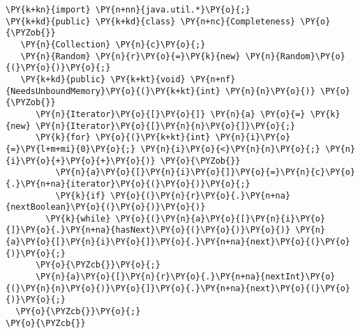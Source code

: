 \begin{Verbatim}[commandchars=\\\{\}]
\PY{k+kn}{import} \PY{n+nn}{java.util.*}\PY{o}{;}
\PY{k+kd}{public} \PY{k+kd}{class} \PY{n+nc}{Completeness} \PY{o}{\PYZob{}}
   \PY{n}{Collection} \PY{n}{c}\PY{o}{;}
   \PY{n}{Random} \PY{n}{r}\PY{o}{=}\PY{k}{new} \PY{n}{Random}\PY{o}{(}\PY{o}{)}\PY{o}{;}
   \PY{k+kd}{public} \PY{k+kt}{void} \PY{n+nf}{NeedsUnboundMemory}\PY{o}{(}\PY{k+kt}{int} \PY{n}{n}\PY{o}{)} \PY{o}{\PYZob{}}
      \PY{n}{Iterator}\PY{o}{[}\PY{o}{]} \PY{n}{a} \PY{o}{=} \PY{k}{new} \PY{n}{Iterator}\PY{o}{[}\PY{n}{n}\PY{o}{]}\PY{o}{;}
      \PY{k}{for} \PY{o}{(}\PY{k+kt}{int} \PY{n}{i}\PY{o}{=}\PY{l+m+mi}{0}\PY{o}{;} \PY{n}{i}\PY{o}{<}\PY{n}{n}\PY{o}{;} \PY{n}{i}\PY{o}{+}\PY{o}{+}\PY{o}{)} \PY{o}{\PYZob{}}
          \PY{n}{a}\PY{o}{[}\PY{n}{i}\PY{o}{]}\PY{o}{=}\PY{n}{c}\PY{o}{.}\PY{n+na}{iterator}\PY{o}{(}\PY{o}{)}\PY{o}{;}
          \PY{k}{if} \PY{o}{(}\PY{n}{r}\PY{o}{.}\PY{n+na}{nextBoolean}\PY{o}{(}\PY{o}{)}\PY{o}{)} 
	    \PY{k}{while} \PY{o}{(}\PY{n}{a}\PY{o}{[}\PY{n}{i}\PY{o}{]}\PY{o}{.}\PY{n+na}{hasNext}\PY{o}{(}\PY{o}{)}\PY{o}{)} \PY{n}{a}\PY{o}{[}\PY{n}{i}\PY{o}{]}\PY{o}{.}\PY{n+na}{next}\PY{o}{(}\PY{o}{)}\PY{o}{;}	
      \PY{o}{\PYZcb{}}\PY{o}{;}
      \PY{n}{a}\PY{o}{[}\PY{n}{r}\PY{o}{.}\PY{n+na}{nextInt}\PY{o}{(}\PY{n}{n}\PY{o}{)}\PY{o}{]}\PY{o}{.}\PY{n+na}{next}\PY{o}{(}\PY{o}{)}\PY{o}{;}
  \PY{o}{\PYZcb{}}\PY{o}{;}
\PY{o}{\PYZcb{}}
\end{Verbatim}
